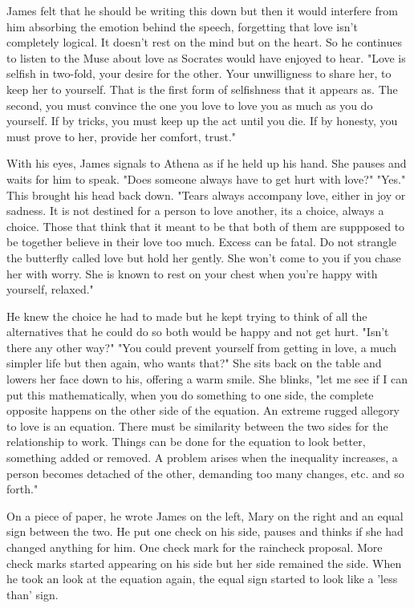         James felt that he should be writing this down but then it would interfere from him absorbing the emotion behind the speech, forgetting
    that love isn't completely logical. It doesn't rest on the mind but on the heart. So he continues to listen to the Muse about love as
    Socrates would have enjoyed to hear. "Love is selfish in two-fold, your desire for the other. Your unwilligness to share her, to keep her
    to yourself. That is the first form of selfishness that it appears as. The second, you must convince the one you love to love you as much
    as you do yourself. If by tricks, you must keep up the act until you die. If by honesty, you must prove to her, provide her comfort, trust."


        With his eyes, James signals to Athena as if he held up his hand. She pauses and waits for him to speak. "Does someone always have to
    get hurt with love?" "Yes." This brought his head back down. "Tears always accompany love, either in joy or sadness. It is not destined for
    a person to love another, its a choice, always a choice. Those that think that it meant to be that both of them are suppposed to be together
    believe in their love too much. Excess can be fatal. Do not strangle the butterfly called love but hold her gently. She won't come to you
    if you chase her with worry. She is known to rest on your chest when you're happy with yourself, relaxed."

        He knew the choice he had to made but he kept trying to think of all the alternatives that he could do so both would be happy and not
    get hurt. "Isn't there any other way?" "You could prevent yourself from getting in love, a much simpler life but then again, who wants that?"
    She sits back on the table and lowers her face down to his, offering a warm smile. She blinks, "let me see if I can put this mathematically,
    when you do something to one side, the complete opposite happens on the other side of the equation. An extreme rugged allegory to love is
    an equation. There must be similarity between the two sides for the relationship to work. Things can be done for the equation to look better,
    something added or removed. A problem arises when the inequality increases, a person becomes detached of the other, demanding too many 
    changes, etc. and so forth."

        On a piece of paper, he wrote James on the left, Mary on the right and an equal sign between the two. He put one check on his side, 
    pauses and thinks if she had changed anything for him. One check mark for the raincheck proposal. More check marks started appearing on his
    side but her side remained the side. When he took an look at the equation again, the equal sign started to look like a 'less than' sign.

